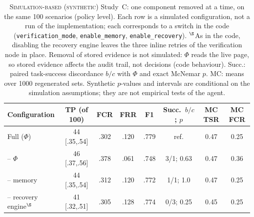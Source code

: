 \begin{table}[t]
\centering
\caption{\textsc{Simulation-based (synthetic)} Study~C: one component removed at a time, on the same 100 scenarios (policy level). Each row is a simulated configuration, not a run of the implementation; each corresponds to a switch in the code (\texttt{verification\_mode}, \texttt{enable\_memory}, \texttt{enable\_recovery}). $^{\S}$As in the code, disabling the recovery engine leaves the three inline retries of the verification node in place. Removal of stored evidence is not simulated: $\Phi$ reads the live page, so stored evidence affects the audit trail, not decisions (code behaviour). Succ.: paired task-success discordance $b/c$ with $\Phi$ and exact McNemar $p$. MC: means over 1000 regenerated sets. Synthetic $p$-values and intervals are conditional on the simulation assumptions; they are not empirical tests of the agent.}
\label{tab:sim-ablation}
\scriptsize
\setlength{\tabcolsep}{1.6pt}
\begin{tabular}{@{}lccccccc@{}}
\toprule
Configuration & TP (of 100) & FCR & FRR & F1 & Succ.\ $b/c$; $p$ & MC TSR & MC FCR \\
\midrule
Full ($\Phi$) & 44 [.35,.54] & .302 & .120 & .779 & ref. & 0.47 & 0.25 \\
-- $\Phi$ & 46 [.37,.56] & .378 & .061 & .748 & 3/1; 0.63 & 0.47 & 0.36 \\
-- memory & 44 [.35,.54] & .312 & .120 & .772 & 1/1; 1.0 & 0.47 & 0.25 \\
-- recovery engine$^{\S}$ & 41 [.32,.51] & .305 & .128 & .774 & 0/3; 0.25 & 0.45 & 0.25 \\
\bottomrule
\end{tabular}
\end{table}
